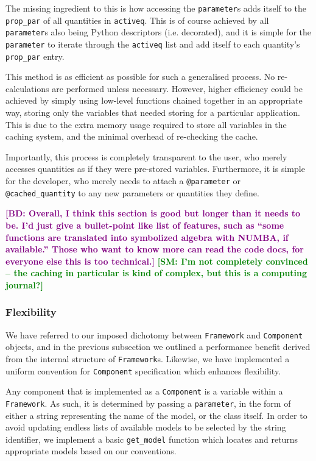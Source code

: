 \documentclass[5p]{elsarticle}
\newcommand{\bd}[1]{\textcolor{purple}{\textbf{[BD: #1]}}}
\newcommand{\sgm}[1]{\textcolor{green}{\textbf{[SM: #1]}}}
\begin{document}
The missing ingredient to this is how accessing the \verb|parameter|s adds itself to the \verb|prop_par| of all quantities in \verb|activeq|. This is of course achieved
by all \verb|parameter|s also being Python descriptors (i.e. decorated), and it is simple for the \verb|parameter| to iterate through the \verb|activeq| list and add itself to each quantity's \verb|prop_par| entry.

This method is as efficient as possible for such a generalised process. No re-calculations are performed unless necessary. However, higher efficiency could be achieved by simply using low-level functions chained together in an appropriate way, storing only the variables that needed storing for a particular application. This is due to the extra memory usage required to store all variables in the caching system, and the minimal overhead of re-checking the cache. 

Importantly, this process is completely transparent to the user, who merely accesses quantities as if they were pre-stored variables. Furthermore, it is simple for the developer, who merely needs to attach a \verb|@parameter| or \verb|@cached_quantity| to any new parameters or quantities they define. 

\bd{Overall, I think this section is good but longer than it needs to be. I'd just give a bullet-point like list of features, such as ``some functions are translated into symbolized algebra with NUMBA, if available.'' Those who want to know more can read the code docs, for everyone else this is too technical.}
\sgm{I'm not completely convinced -- the caching in particular is kind of complex, but this is a computing journal?}

\subsubsection{Flexibility}
\label{sec:halomod:overview:flexibility}
We have referred to our imposed dichotomy between \verb|Framework| and \verb|Component| objects, and in the previous subsection we outlined a performance benefit derived from the internal structure of \verb|Framework|s. Likewise, we have implemented a uniform convention for \verb|Component| specification which enhances flexibility.

Any component that is implemented as a \verb|Component| is a variable within a \verb|Framework|. As such, it is determined by passing a \verb|parameter|, in the form of either a string representing the name of the model, or the class itself. In order to avoid updating endless lists of available models to be selected by the string identifier, we implement a basic \verb|get_model| function which locates and returns appropriate models based on our conventions. 
\end{document}
